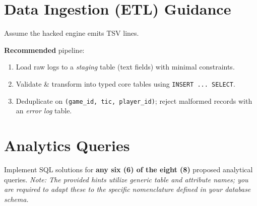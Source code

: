 \documentclass[11pt]{article}
\begin{document}
\section{Data Ingestion (ETL) Guidance}
Assume the hacked engine emits TSV lines.

\noindent \textbf{Recommended} pipeline:
\begin{enumerate}[leftmargin=*]
  \item Load raw logs to a \emph{staging} table (text fields) with minimal constraints.
  \item Validate \& transform into typed core tables using \texttt{INSERT ... SELECT}.
  \item Deduplicate on \texttt{(game\_id, tic, player\_id)}; reject malformed records with an \emph{error log} table.
\end{enumerate}

\section{Analytics Queries} \label{sec:queries}
Implement SQL solutions for \textbf{any six (6) of the eight (8)} proposed analytical queries. \textit{Note: The provided hints utilize generic table and attribute names; you are required to adapt these to the specific nomenclature defined in your database schema.}
\end{document}
